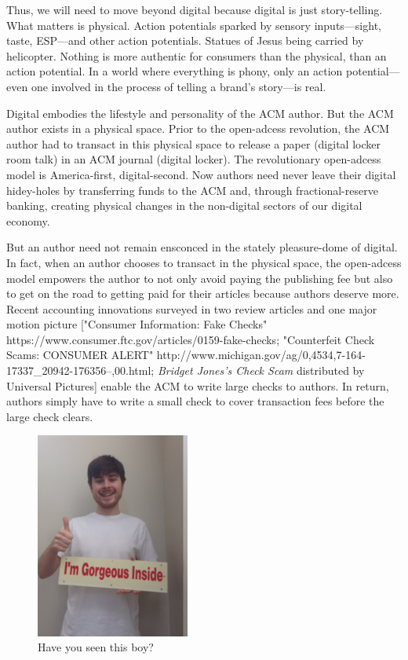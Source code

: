 Thus, we will need to move beyond digital because digital is just story-telling. What matters is physical. Action potentials sparked by sensory inputs---sight, taste, ESP---and other action potentials. Statues of Jesus being carried by helicopter. Nothing is more authentic for consumers than the physical, than an action potential. In a world where everything is phony, only an action potential---even one involved in the process of telling a brand's story---is real.

Digital embodies the lifestyle and personality of the ACM author. But the ACM author exists in a physical space. Prior to the open-adcess revolution, the ACM author had to transact in this physical space to release a paper (digital locker room talk) in an ACM journal (digital locker). The revolutionary open-adcess model is America-first, digital-second. Now authors need never leave their digital hidey-holes by transferring funds to the ACM and, through fractional-reserve banking, creating physical changes in the non-digital sectors of our digital economy. 

But an author need not remain ensconced in the stately pleasure-dome of digital. In fact, when an author chooses to transact in the physical space, the open-adcess model empowers the author to not only avoid paying the publishing fee but also to get on the road to getting paid for their articles because authors deserve more. Recent accounting innovations surveyed in two review articles and one major motion picture ["Consumer Information: Fake Checks"
https://www.consumer.ftc.gov/articles/0159-fake-checks; "Counterfeit Check
Scams: CONSUMER ALERT" http://www.michigan.gov/ag/0,4534,7-164-17337\_20942-176356--,00.html; \textit{Bridget Jones's Check Scam} distributed by Universal Pictures] enable the ACM to write large checks to authors. In return, authors simply have to write a small check to cover transaction fees before the large check clears.

\begin{figure}
\centering
\includegraphics[width=0.45\textwidth]{figures/ad.jpg}
\caption{Have you seen this boy?}
\end{figure}
